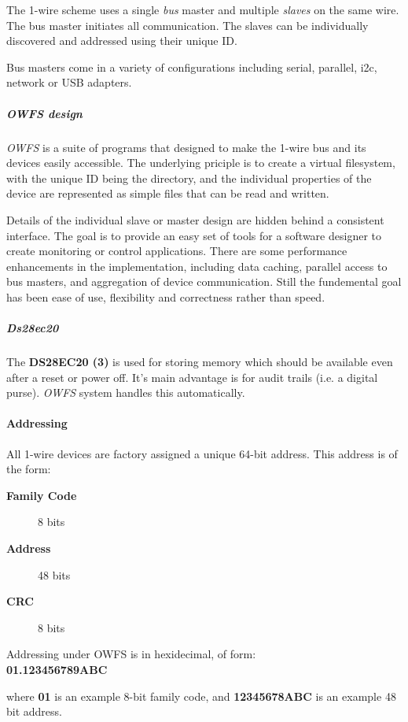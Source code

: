 The 1-wire scheme uses a single  \textit{bus} master
and multiple \textit{slaves} on the same wire. The bus master initiates all communication.
The slaves can be  individually discovered and addressed using their unique
ID. 

Bus masters come in a variety of configurations including serial, parallel,
i2c, network or USB adapters. 
\subparagraph*{OWFS design}\textit{OWFS} is a suite of programs that
designed to make the 1-wire bus and its devices easily accessible. The underlying
priciple is to create a virtual filesystem, with the unique ID being the
directory, and the individual properties of the device are represented
as simple files that can be read and written. 

Details of the individual
slave or master design are hidden behind a consistent interface. The goal
is to  provide an easy set of tools for a software designer to create monitoring
or control applications. There  are some performance enhancements in the
implementation, including data caching, parallel access to bus  masters,
and aggregation of device communication. Still the fundemental goal has
been ease of use, flexibility  and correctness rather than speed.  
\subparagraph*{Ds28ec20}The
\textsf{\textbf{DS28EC20 (3)}} is used for storing memory which should be available even
after a reset or power off. It's main advantage is for audit trails (i.e. a
digital purse). \textit{OWFS} system handles this automatically. 
\paragraph*{Addressing}
      
   All 1-wire devices are factory assigned a unique 64-bit address. This address
is of the form: \begin{description}
\item [\textbf{Family Code} ] 8 bits 
\item [\textbf{Address} ] 48 bits 
\item [\textbf{CRC} ] 8 bits 
\end{description}


\begin{description}
\item [Addressing
under OWFS is in hexidecimal, of form: ] 
\item [\textbf{01.123456789ABC} ] 
\end{description}


where \textbf{01} is an example
8-bit family code, and \textbf{12345678ABC} is an example 48 bit address. 

